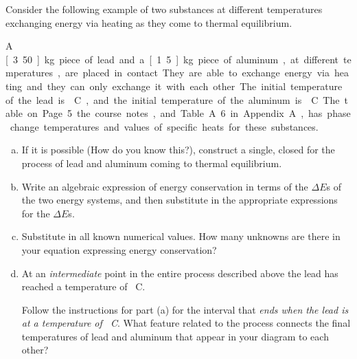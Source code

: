 \label{fnt1.2.1-2}

Consider the following example of two substances at different temperatures exchanging energy via heating as they come to thermal equilibrium.

A \unit[3.50]{kg} piece of lead and a \unit[1.5]{kg} piece of aluminum, at different temperatures, are placed in contact. They are able to exchange energy via heating and they can only exchange it with each other. The initial temperature of the lead is \unit[48]{\textdegree C}, and the initial temperature of the aluminum is \unit[35]{\textdegree C}. The table on Page 5 the course notes, and Table A.6 in Appendix A, has phase change temperatures and values of specific heats for these substances. 

\begin{enumerate}[(a)]
	\item If it is possible (How do you know this?), construct a single, closed \EnergyDiagram{} for the process of lead and aluminum coming to thermal equilibrium.

	\item Write an algebraic expression of energy conservation in terms of the $\Delta E$s of the two energy systems, and then substitute in the appropriate expressions for the $\Delta E$s.

	\item Substitute in all known numerical values. How many unknowns are there in your equation expressing energy conservation?

	\item At an {\em intermediate} point in the entire process described above the lead has reached a temperature of \unit[43]{\textdegree C}.
	
	Follow the instructions for part (a) for the interval that \emph{ends when the lead is at a temperature of \unit[43]{\textdegree C}}. What feature related to the process connects the final temperatures of lead and aluminum that appear in your diagram to each other?

\end{enumerate}